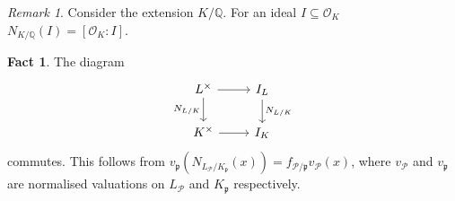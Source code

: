 \documentclass[11pt]{article}
\theoremstyle{definition}
\newtheorem*{fact}{Fact}
\theoremstyle{plain}
\theoremstyle{remark}
\newtheorem*{remark}{Remark}
\newcommand{\QQ}{\mathbb{Q}}
\newcommand{\cO}{\mathcal{O}}
\newcommand{\cP}{\mathcal{P}}
\newcommand{\fp}{\mathfrak{p}}
\begin{document}
\begin{remark}
    Consider the extension $K / \QQ$. For an ideal $I \subseteq \cO_K$ $N_{K / \QQ}(I) = [\cO_K : I]$.
\end{remark}

\begin{fact} The diagram
    \begin{equation*}
    \begin{tikzcd}
        L^\times \arrow[d, "N_{L/K}"'] \arrow[r] & I_L \arrow[d, "N_{L/K}"]\\
        K^\times \arrow[r] & I_K
    \end{tikzcd}
    \end{equation*}
    commutes. This follows from $v_\fp(N_{L_\cP/K_\fp}(x)) = f_{\cP / \fp} v_\cP(x)$, where $v_\cP$ and $v_\fp$ are normalised valuations on $L_\cP$ and $K_\fp$ respectively.
\end{fact}
\end{document}
